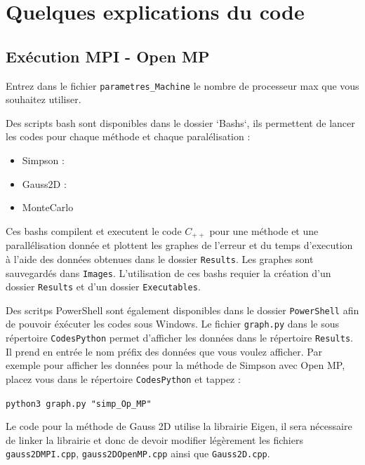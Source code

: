 \documentclass[10pt,a4paper]{article}
\begin{document}
\newpage
\section{Quelques explications du code}


\subsection{Exécution MPI - Open MP}

Entrez dans le fichier \verb|parametres_Machine| le nombre de processeur max que vous souhaitez utiliser.

Des scripts bash sont disponibles dans le dossier `Bashs`, ils permettent de lancer les codes pour chaque méthode et chaque paralélisation : 
\begin{itemize}
  \item Simpson : 
  \item Gauss2D :
  \item MonteCarlo 
\end{itemize}

Ces bashs compilent et executent le code $C_{++}$ pour une méthode et une parallélisation donnée et plottent les graphes de l'erreur et du temps d'execution à l'aide des données obtenues dans le dossier \verb|Results|. Les graphes sont sauvegardés dans \verb|Images|. L'utilisation de ces bashs requier la création d'un dossier \verb|Results| et d'un dossier \verb|Executables|.


Des scritps PowerShell sont également disponibles dans le dossier \verb|PowerShell| afin de pouvoir éxécuter les codes sous Windows.
\newline
Le fichier \verb|graph.py| dans le sous répertoire \verb|CodesPython| permet d'afficher les données dans le répertoire \verb|Results|. 
Il prend en entrée le nom préfix des données que vous voulez afficher.
Par exemple pour afficher les données pour la méthode de Simpson avec Open MP, placez vous dans le répertoire \verb|CodesPython| et tappez : 
\begin{center}
\verb|python3 graph.py "simp_Op_MP"|
\end{center}
Le code pour la méthode de Gauss 2D utilise la librairie Eigen, il sera nécessaire de linker la librairie et donc de devoir modifier légèrement les fichiers \verb|gauss2DMPI.cpp|, \verb|gauss2DOpenMP.cpp| ainsi que \verb|Gauss2D.cpp|.
\end{document}
